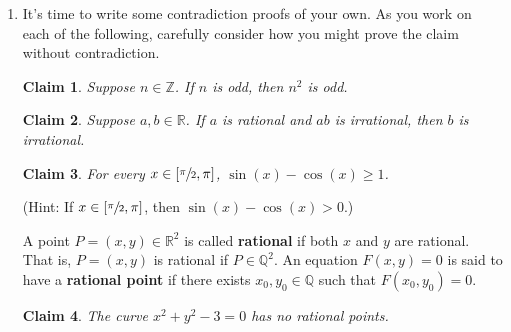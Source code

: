 \documentclass[12 pt]{article}
\newcommand{\R}{\mathbb{R}}
\newcommand{\Z}{\mathbb{Z}}
\theoremstyle{definition}
\theoremstyle{plain}
\theoremstyle{mytheorem}
\theoremstyle{myexample}
\newtheorem{claim}{Claim}
\theoremstyle{mydefinition}
\begin{document}
\begin{enumerate}
\item It's time to write some contradiction proofs of your own.  As you work on each of the following, carefully consider how you might prove the claim without contradiction.  

\begin{claim}  Suppose $n \in \Z$.  If $n$ is odd, then $n^2$ is odd.
\end{claim}

\newpage

\begin{claim}  Suppose $a,b \in \R$.  If $a$ is rational and $ab$ is irrational, then $b$ is irrational.
\end{claim}
\vspace{3in}
\begin{claim}  For every $x \in [\sfrac{\pi}{2},\pi]$, $\sin(x)-\cos(x) \geq 1$.
\end{claim}
(Hint: If $x \in [\sfrac{\pi}{2},\pi]$, then $\sin(x)-\cos(x)>0$.)

\newpage
A point $P=(x,y) \in \R^2$ is called \textbf{rational} if both $x$ and $y$ are rational.  That is, $P=(x,y)$ is rational if $P \in \mathbb{Q}^2$.  An equation $F(x,y)=0$ is said to have a \textbf{rational point} if there exists $x_0,y_0 \in \mathbb{Q}$ such that $F(x_0,y_0)=0$.  
\begin{claim}  The curve $x^2+y^2-3=0$ has no rational points.
\end{claim}
\end{enumerate}
\end{document}
